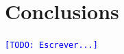 \documentclass[letterpaper, 12pt]{article}
\newcommand{\inote}[1]{\textcolor{blue}{\texttt{\footnotesize[#1]}}}
\newcommand{\todo}[1]{\inote{TODO: #1}}
\begin{document}


\section{Conclusions}




\todo{Escrever...}



\end{document}
